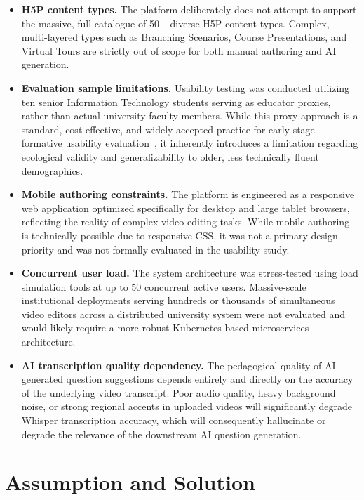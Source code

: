 \begin{itemize}
  \item \textbf{H5P content types.} The platform deliberately does not attempt to support the massive, full catalogue of 50+ diverse H5P content types. Complex, multi-layered types such as Branching Scenarios, Course Presentations, and Virtual Tours are strictly out of scope for both manual authoring and AI generation.
  \item \textbf{Evaluation sample limitations.} Usability testing was conducted utilizing ten senior Information Technology students serving as educator proxies, rather than actual university faculty members. While this proxy approach is a standard, cost-effective, and widely accepted practice for early-stage formative usability evaluation~\cite{nielsen1994}, it inherently introduces a limitation regarding ecological validity and generalizability to older, less technically fluent demographics.
  \item \textbf{Mobile authoring constraints.} The platform is engineered as a responsive web application optimized specifically for desktop and large tablet browsers, reflecting the reality of complex video editing tasks. While mobile authoring is technically possible due to responsive CSS, it was not a primary design priority and was not formally evaluated in the usability study.
  \item \textbf{Concurrent user load.} The system architecture was stress-tested using load simulation tools at up to 50 concurrent active users. Massive-scale institutional deployments serving hundreds or thousands of simultaneous video editors across a distributed university system were not evaluated and would likely require a more robust Kubernetes-based microservices architecture.
  \item \textbf{AI transcription quality dependency.} The pedagogical quality of AI-generated question suggestions depends entirely and directly on the accuracy of the underlying video transcript. Poor audio quality, heavy background noise, or strong regional accents in uploaded videos will significantly degrade Whisper transcription accuracy, which will consequently hallucinate or degrade the relevance of the downstream AI question generation.
\end{itemize}

\section{Assumption and Solution}


